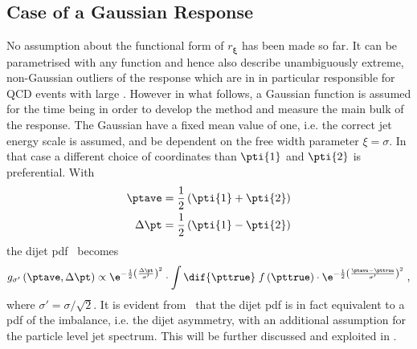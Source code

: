 \subsection{Case of a Gaussian Response}

No assumption about the functional form of $r_{\mathbf{\xi}}$ has been
made so far.
It can be parametrised with any function and hence also
describe unambiguously extreme, non-Gaussian outliers of the response which are in
in particular responsible for QCD events with large \met.
However in what follows, a Gaussian function is assumed for the time
being in order to develop the method and measure the main bulk of the
response.
The Gaussian have a fixed mean value of one, i.e. the
correct jet energy scale is assumed, and be dependent on the free width
parameter \mbox{$\mathcal{\xi} = \sigma$}.
In that case a different choice of coordinates than $\pti{1}$ and
$\pti{2}$ is preferential.
With
\begin{align}
  \label{eq:ResFit:TransformedCoordinates}
  \begin{split}
    \ptave     &  = \frac{1}{2}\left(\pti{1}+\pti{2}\right) \\
    \Delta\pt  &  = \frac{1}{2}\left(\pti{1}-\pti{2}\right)
  \end{split}
\end{align} 
the dijet pdf~ becomes
\begin{equation}
  \label{eq:ResFit:DijetPdfTransformed}
   g_{\sigma'}\left(\ptave,\Delta\pt\right) \propto
   \e^{-\frac{1}{2}\left(\frac{\Delta\pt}{\sigma'}\right)^{2}}\cdot
   \int\dif{\pttrue}\;f\left(\pttrue\right)\cdot
   \e^{-\frac{1}{2}\left(\frac{\ptave - \pttrue}{\sigma'}\right)^{2}}
   \; ,
\end{equation}
where \mbox{$\sigma' = \sigma/\sqrt{2}$}.
It is evident from~ that the dijet
pdf is in fact equivalent to a pdf of the \pt imbalance, i.e. the dijet
asymmetry, with an additional assumption for the particle level jet
\pt spectrum.
This will be further discussed and exploited in .
